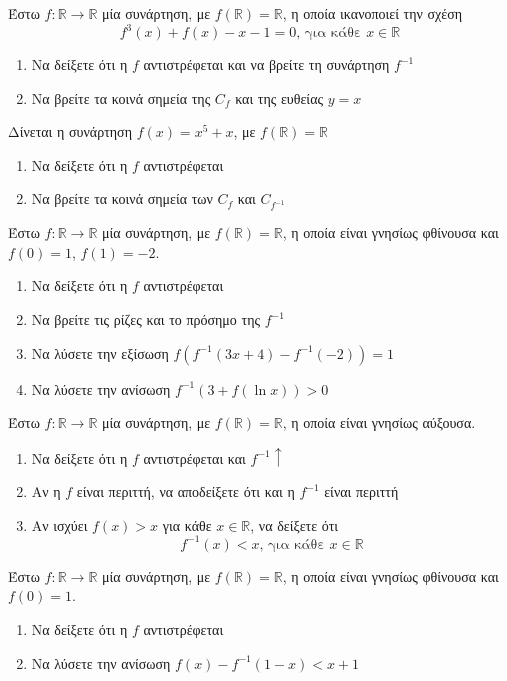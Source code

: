 \documentclass{presentation}
\begin{document}
\begin{askisi}
  Έστω $f:\mathbb{R}\to\mathbb{R}$ μία συνάρτηση, με $f(\mathbb{R})=\mathbb{R}$, η οποία ικανοποιεί την σχέση
  $$f^3(x)+f(x)-x-1=0\text{, για κάθε }x\in \mathbb{R}$$
  \begin{enumerate}[<+->]
    \item Να δείξετε ότι η $f$ αντιστρέφεται και να βρείτε τη συνάρτηση $f^{-1}$
    \item Να βρείτε τα κοινά σημεία της $C_f$ και της ευθείας $y=x$
  \end{enumerate}
\end{askisi}

\begin{askisi}
  Δίνεται η συνάρτηση $f(x)=x^5+x$, με $f(\mathbb{R})=\mathbb{R}$
  \begin{enumerate}[<+->]
    \item Να δείξετε ότι η $f$ αντιστρέφεται
    \item Να βρείτε τα κοινά σημεία των $C_f$ και $C_{f^{-1}}$
  \end{enumerate}
\end{askisi}

\begin{askisi}
  Έστω $f:\mathbb{R}\to\mathbb{R}$ μία συνάρτηση, με $f(\mathbb{R})=\mathbb{R}$, η οποία είναι γνησίως φθίνουσα και $f(0)=1$, $f(1)=-2$.
  \begin{enumerate}[<+->]
    \item Να δείξετε ότι η $f$ αντιστρέφεται
    \item Να βρείτε τις ρίζες και το πρόσημο της $f^{-1}$
    \item Να λύσετε την εξίσωση $f\left(f^{-1}(3x+4)-f^{-1}(-2)\right)=1$
    \item Να λύσετε την ανίσωση $f^{-1}\left(3+f(\ln x)\right)>0$
  \end{enumerate}
\end{askisi}

\begin{askisi}
  Έστω $f:\mathbb{R}\to\mathbb{R}$ μία συνάρτηση, με $f(\mathbb{R})=\mathbb{R}$, η οποία είναι γνησίως αύξουσα.
  \begin{enumerate}[<+->]
    \item Να δείξετε ότι η $f$ αντιστρέφεται και $f^{-1}\uparrow$
    \item Αν η $f$ είναι περιττή, να αποδείξετε ότι και η $f^{-1}$ είναι περιττή
    \item Αν ισχύει $f(x)>x$ για κάθε $x\in\mathbb{R}$, να δείξετε ότι
          $$f^{-1}(x)<x\text{, για κάθε }x\in\mathbb{R}$$
  \end{enumerate}
\end{askisi}

\begin{askisi}
  Έστω $f:\mathbb{R}\to\mathbb{R}$ μία συνάρτηση, με $f(\mathbb{R})=\mathbb{R}$, η οποία είναι γνησίως φθίνουσα και $f(0)=1$.
  \begin{enumerate}[<+->]
    \item Να δείξετε ότι η $f$ αντιστρέφεται
    \item Να λύσετε την ανίσωση $f(x)-f^{-1}(1-x)<x+1$
  \end{enumerate}
\end{askisi}


\moodle
\end{document}
